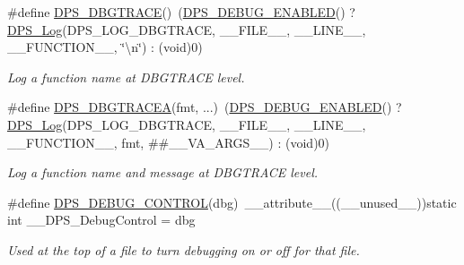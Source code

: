 \begin{DoxyCompactItemize}
\#define \hyperlink{group__debug_ga0a4156dc81e39b0cf2fb251e37bda307}{D\+P\+S\+\_\+\+D\+B\+G\+T\+R\+A\+CE}()~(\hyperlink{group__debug_gaeca5ec86966717c8dd2d1ffda4be2b3b}{D\+P\+S\+\_\+\+D\+E\+B\+U\+G\+\_\+\+E\+N\+A\+B\+L\+ED}() ? \hyperlink{group__debug_ga174fef61dca16376546e570c9b831502}{D\+P\+S\+\_\+\+Log}(D\+P\+S\+\_\+\+L\+O\+G\+\_\+\+D\+B\+G\+T\+R\+A\+CE, \+\_\+\+\_\+\+F\+I\+L\+E\+\_\+\+\_\+, \+\_\+\+\_\+\+L\+I\+N\+E\+\_\+\+\_\+, \+\_\+\+\_\+\+F\+U\+N\+C\+T\+I\+O\+N\+\_\+\+\_\+, \char`\"{}\textbackslash{}n\char`\"{}) \+: (void)0)
\begin{DoxyCompactList}\small\item\em Log a function name at D\+B\+G\+T\+R\+A\+CE level. \end{DoxyCompactList}\item 
\mbox{\label{group__debug_ga62bb2ddb60beb7390755a19cd7874b5c}} 
\#define \hyperlink{group__debug_ga62bb2ddb60beb7390755a19cd7874b5c}{D\+P\+S\+\_\+\+D\+B\+G\+T\+R\+A\+C\+EA}(fmt, ...)~(\hyperlink{group__debug_gaeca5ec86966717c8dd2d1ffda4be2b3b}{D\+P\+S\+\_\+\+D\+E\+B\+U\+G\+\_\+\+E\+N\+A\+B\+L\+ED}() ? \hyperlink{group__debug_ga174fef61dca16376546e570c9b831502}{D\+P\+S\+\_\+\+Log}(D\+P\+S\+\_\+\+L\+O\+G\+\_\+\+D\+B\+G\+T\+R\+A\+CE, \+\_\+\+\_\+\+F\+I\+L\+E\+\_\+\+\_\+, \+\_\+\+\_\+\+L\+I\+N\+E\+\_\+\+\_\+, \+\_\+\+\_\+\+F\+U\+N\+C\+T\+I\+O\+N\+\_\+\+\_\+, fmt, \#\#\+\_\+\+\_\+\+V\+A\+\_\+\+A\+R\+G\+S\+\_\+\+\_\+) \+: (void)0)
\begin{DoxyCompactList}\small\item\em Log a function name and message at D\+B\+G\+T\+R\+A\+CE level. \end{DoxyCompactList}\item 
\mbox{\label{group__debug_ga6990490017f384ce2d462e1b5c0963b8}} 
\#define \hyperlink{group__debug_ga6990490017f384ce2d462e1b5c0963b8}{D\+P\+S\+\_\+\+D\+E\+B\+U\+G\+\_\+\+C\+O\+N\+T\+R\+OL}(dbg)~\+\_\+\+\_\+attribute\+\_\+\+\_\+((\+\_\+\+\_\+unused\+\_\+\+\_\+))static int \+\_\+\+\_\+\+D\+P\+S\+\_\+\+Debug\+Control = dbg
\begin{DoxyCompactList}\small\item\em Used at the top of a file to turn debugging on or off for that file. \end{DoxyCompactList}\item 
\mbox{\label{group__debug_gaeca5ec86966717c8dd2d1ffda4be2b3b}} 

\end{DoxyCompactItemize}
